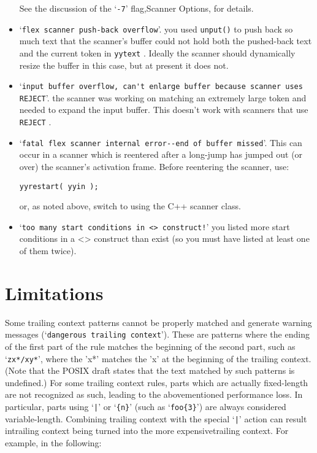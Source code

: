 \documentclass[openany,oneside]{book}
\begin{document}
\begin{itemize}
See the discussion of the ‘\verb`-7`’ flag,Scanner Options, for
details.
\item ‘\verb`flex scanner push-back overflow`’. you used \verb`unput()` to push
back so much text that the scanner's buffer could not hold both the
pushed-back text and the current token in \verb`yytext` .  Ideally the
scanner should dynamically resize the buffer in this case, but at
present it does not.
\item ‘\verb`input buffer overflow, can't enlarge buffer because scanner uses REJECT`’.  the scanner was working on matching an extremely large token
and needed to expand the input buffer.  This doesn't work with scanners
that use \verb`REJECT` .
\item ‘\verb`fatal flex scanner internal error--end of buffer missed`’. This can
occur in a scanner which is reentered after a long-jump has jumped out
(or over) the scanner's activation frame.  Before reentering the
scanner, use:
\begin{verbatim}
yyrestart( yyin );
\end{verbatim}


or, as noted above, switch to using the C++ scanner class.
\item ‘\verb`too many start conditions in <> construct!`’  you listed more start
conditions in a <> construct than exist (so you must have listed at
least one of them twice).
\end{itemize}

\chapter{Limitations}


Some trailing context patterns cannot be properly matched and generate
warning messages (‘\verb`dangerous trailing context`’).  These are
patterns where the ending of the first part of the rule matches the
beginning of the second part, such as ‘\verb`zx*/xy*`’, where the 'x*'
matches the 'x' at the beginning of the trailing context.  (Note that
the POSIX draft states that the text matched by such patterns is
undefined.)  For some trailing context rules, parts which are actually
fixed-length are not recognized as such, leading to the abovementioned
performance loss.  In particular, parts using ‘\verb`|`’ or ‘\verb`{n}`’
(such as ‘\verb`foo{3}`’) are always considered variable-length. 
Combining trailing context with the special ‘\verb`|`’ action can result
intrailing context being turned into the more expensivetrailing context.  For example, in the following:
\end{document}
